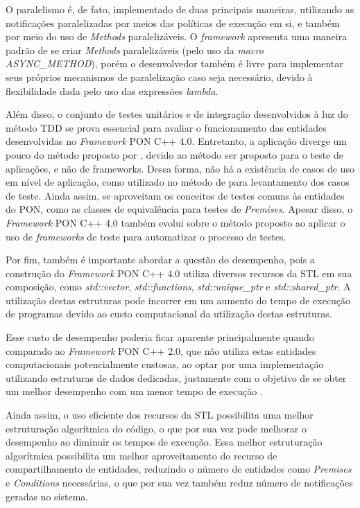 O paralelismo é, de fato, implementado de duas principais maneiras, utilizando
as notificações paralelizadas por meios das políticas de execução em si, e
também por meio do uso de \textit{Methods} paralelizáveis. O \textit{framework}
apresenta uma maneira padrão de se criar \textit{Methods} paralelizáveis (pelo
uso da \textit{macro} \textit{ASYNC\_METHOD}), porém o desenvolvedor também é
livre para implementar seus próprios mecanismos de paralelização caso seja
necessário, devido à flexibilidade dada pelo uso das expressões \textit{lambda}.

Além disso, o conjunto de testes unitários e de integração desenvolvidos à luz
do método TDD se prova essencial para avaliar o funcionamento das entidades
desenvolvidas no \textit{Framework} PON C++ 4.0. Entretanto, a aplicação diverge
um pouco do método proposto por , devido ao método
ser proposto para o teste de aplicações, e não de frameworks. Dessa forma, não
há a existência de casos de uso em nível de aplicação, como utilizado no método
de  para levantamento dos casos de teste. Ainda
assim, se aproveitam os conceitos de testes comuns às entidades do PON, como as
classes de equivalência para testes de \textit{Premises}. Apesar disso, o
\textit{Framework} PON C++ 4.0 também evolui sobre o método proposto ao aplicar
o uso de \textit{frameworks} de teste para automatizar o processo de testes.

Por fim, também é importante abordar a questão do desempenho, pois a construção
do \textit{Framework} PON C++ 4.0 utiliza diversos recursos da STL em sua
composição, como \textit{std::vector}, \textit{std::functions},
\textit{std::unique\_ptr} e \textit{std::shared\_ptr}. A utilização destas
estruturas pode incorrer em um aumento do tempo de execução de programas devido
ao custo computacional da utilização destas estruturas.

Esse custo de desempenho poderia ficar aparente principalmente quando comparado
ao \textit{Framework} PON C++ 2.0, que não utiliza estas entidades
computacionais potencialmente custosas, ao optar por uma implementação
utilizando estruturas de dados dedicadas, justamente com o objetivo de se obter
um melhor desempenho com um menor tempo de execução \cite{msc_valenca_2012}.

Ainda assim, o uso eficiente dos recursos da STL possibilita uma melhor
estruturação algorítmica do código, o que por sua vez pode melhorar o desempenho
ao diminuir os tempos de execução. Essa melhor estruturação algorítmica
possibilita um melhor aproveitamento do recurso de compartilhamento de
entidades, reduzindo o número de entidades como \textit{Premises} e
\textit{Conditions} necessárias, o que por sua vez também reduz número de
notificações geradas no sistema.

